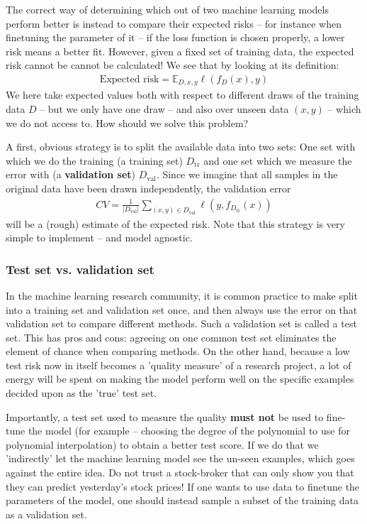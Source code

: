 \documentclass{article}
\newcommand{\tr}{\mathrm{tr}}
\newcommand{\abs}[1]{\vert #1 \vert}
\begin{document}
The correct way of determining which out of two machine learning models perform better is instead to compare their expected risks -- for instance when finetuning the parameter of it -- if the loss function is chosen properly, a lower risk means a better fit. However, given a fixed set of training data, the expected risk cannot be cannot be calculated! We see that by looking at its definition:
\begin{align*}
    \text{Expected risk} = \mathbb{E}_{D,x,y} \ell(f_D(x),y)
\end{align*}
We here take expected values both with respect to different draws of the training data $D$ -- but we only have one draw -- and also over unseen data $(x,y)$ -- which we do not access to. How should we solve this problem?

A first, obvious strategy is to split the available data into two sets: One set with which we do the training (a training set) $D_{\mathrm{tr}}$ and one set which we measure the error with (a \textbf{validation set}) $D_{\mathrm{val}}$. Since we imagine that all samples in the original data have been drawn independently, the validation error 
\begin{align*}
    CV = \frac{1}{\abs{D_\mathrm{val}}} \sum_{(x,y) \in D_\mathrm{val}} \ell(y,f_{D_\tr}(x))
\end{align*}
will be a (rough) estimate of the expected risk. Note that this strategy is very simple to implement -- and model agnostic.

\subsubsection{Test set vs. validation set} In the machine learning research community, it is common practice to make split into a training set and validation set once, and then always use the error on that validation set to compare different methods. Such a validation set is called a test set. This has pros and cons: agreeing on one common test set eliminates the element of chance when comparing methods. On the other hand, because a low test risk now in itself becomes a 'quality measure' of a research project, a lot of energy will be spent on making the model perform well on the specific examples decided upon as the 'true' test set. 

Importantly, a test set used to measure the quality \textbf{must not} be used to fine-tune the model (for example -- choosing the degree of the polynomial to use for polynomial interpolation) to obtain a better test score. If we do that we 'indirectly' let the machine learning model see the un-seen examples, which goes against the entire idea. Do not trust a stock-broker that can only show you that they can predict yesterday's stock prices! If one wants to use data to finetune the parameters of the model, one should instead sample a subset of the training data as a validation set. 
\end{document}

